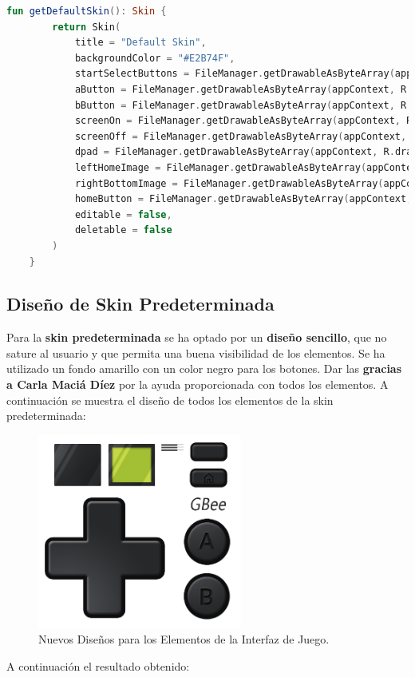 \begin{lstlisting}[language=Kotlin, caption={Configuración de la Skin predeterminada}, label={code:defaultskinconfig}]
    fun getDefaultSkin(): Skin {
        return Skin(
            title = "Default Skin",
            backgroundColor = "#E2B74F",
            startSelectButtons = FileManager.getDrawableAsByteArray(appContext, R.drawable.default_start_select),
            aButton = FileManager.getDrawableAsByteArray(appContext, R.drawable.default_a),
            bButton = FileManager.getDrawableAsByteArray(appContext, R.drawable.default_b),
            screenOn = FileManager.getDrawableAsByteArray(appContext, R.drawable.default_screen),
            screenOff = FileManager.getDrawableAsByteArray(appContext, R.drawable.default_screen_off),
            dpad = FileManager.getDrawableAsByteArray(appContext, R.drawable.default_dpad),
            leftHomeImage = FileManager.getDrawableAsByteArray(appContext, R.drawable.default_logo),
            rightBottomImage = FileManager.getDrawableAsByteArray(appContext, R.drawable.default_speakers),
            homeButton = FileManager.getDrawableAsByteArray(appContext, R.drawable.default_home),
            editable = false,
            deletable = false
        )
    }
\end{lstlisting}

\subsection{Diseño de Skin Predeterminada}
Para la \textbf{skin predeterminada} se ha optado por un \textbf{diseño sencillo}, que no sature al usuario y que permita una buena visibilidad de los elementos. Se ha utilizado un fondo amarillo con un color negro para los botones. Dar las \textbf{gracias a Carla Maciá Díez} por la ayuda proporcionada con todos los elementos. A continuación se muestra el diseño de todos los elementos de la skin predeterminada:

\begin{figure}[H]
    \centering
    \includegraphics[width=0.6\textwidth]{include/images/new_design_elements.png}
    \caption{Nuevos Diseños para los Elementos de la Interfaz de Juego.}\label{figure:newDesignElements}
\end{figure}
\clearpage
A continuación el resultado obtenido:

